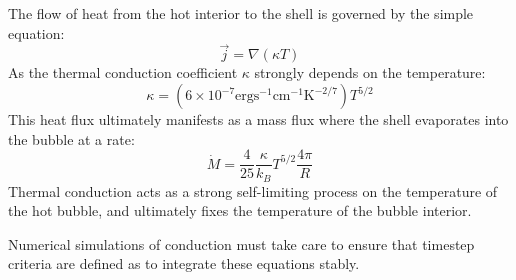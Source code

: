 \documentclass[extrafontsizes, 30pt]{memoir}
\begin{document}
The flow of heat from the hot interior to the shell is
governed by the simple equation:
$$\vec j = \nabla (\kappa T)$$
As the thermal conduction coefficient $\kappa$ strongly depends on the
temperature:
$$\kappa = (6\times10^{-7}  \mathrm{erg s^{-1} cm^{-1} K^{-2/7}})T^{5/2}$$
This heat flux ultimately manifests as a mass flux where the shell evaporates
into the bubble at a rate:
$$\dot M = \frac{4}{25}\frac{\kappa}{k_B} T^{5/2}\frac{4\pi}{R}$$
Thermal conduction acts as a strong self-limiting process on the temperature
of the hot bubble, and ultimately fixes the temperature of the bubble interior.

Numerical simulations of conduction must take care to ensure that timestep
criteria are defined as to integrate these equations stably.
\end{document}

